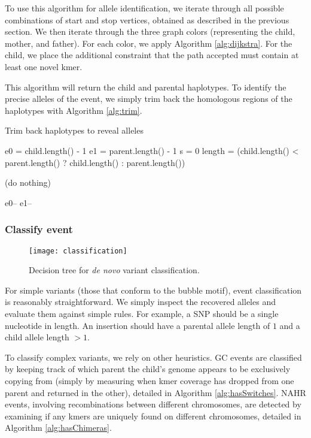 To use this algorithm for allele identification, we iterate through all possible combinations of start and stop vertices, obtained as described in the previous section.  We then iterate through the three graph colors (representing the child, mother, and father).  For each color, we apply Algorithm \ref{alg:dijkstra}.  For the child, we place the additional constraint that the path accepted must contain at least one novel kmer.

This algorithm will return the child and parental haplotypes.  To identify the precise alleles of the event, we simply trim back the homologous regions of the haplotypes with Algorithm \ref{alg:trim}.

\begin{algorithm}
\caption{Trim back haplotypes to reveal alleles}
\label{alg:trim}
\begin{algorithmic}[1]
    \State e0 = child.length() - 1
    \State e1 = parent.length() - 1
    \State s = 0
    \State length = (child.length() < parent.length() ? child.length() : parent.length())

        \State (do nothing)
    \EndFor

        \State e0--
        \State e1--
    \EndWhile
\EndFunction
\end{algorithmic}
\end{algorithm}

\subsubsection{Classify event}

\begin{figure}[p]
  \centering
    \texttt{[image: classification]}
  \caption{Decision tree for \textit{de novo} variant classification.}
  \label{fig:classification}
\end{figure}

For simple variants (those that conform to the bubble motif), event classification is reasonably straightforward.  We simply inspect the recovered alleles and evaluate them against simple rules.  For example, a SNP should be a single nucleotide in length.  An insertion should have a parental allele length of $1$ and a child allele length $> 1$.

To classify complex variants, we rely on other heuristics.  GC events are classified by keeping track of which parent the child's genome appears to be exclusively copying from (simply by measuring when kmer coverage has dropped from one parent and returned in the other), detailed in Algorithm \ref{alg:hasSwitches}.  NAHR events, involving recombinations between different chromosomes, are detected by examining if any kmers are uniquely found on different chromosomes, detailed in Algorithm \ref{alg:hasChimeras}.

